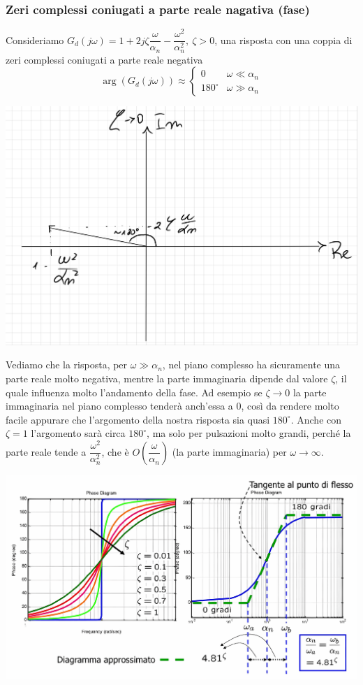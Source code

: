\documentclass{article}
\numberwithin{equation}{subsection}
\begin{document}
\subsubsection{Zeri complessi coniugati a parte reale nagativa (fase)}
Consideriamo $G_d(j\omega) = 1+ 2j \zeta \dfrac{\omega}{\alpha_n} - \dfrac{\omega^2}{\alpha_n^2}, \ \zeta>0$, una risposta con una coppia di zeri complessi coniugati a parte reale negativa
\[
    \arg(G_d(j \omega)) \approx 
    \begin{cases}
        0 & \omega \ll \alpha_n\\
        180^\circ &\omega \gg \alpha_n
    \end{cases}    
\]
\begin{center}
    \includegraphics[scale=0.175]{Images/Diagramma_zeri_cc_neg_1.png}
\end{center}
Vediamo che la risposta, per $\omega \gg \alpha_n$, nel piano complesso ha sicuramente una parte reale molto negativa, mentre la parte immaginaria dipende dal valore $\zeta$, il quale influenza molto l'andamento della fase. Ad esempio se $\zeta \rightarrow 0$ la parte immaginaria nel piano complesso tenderà anch'essa a 0, così da rendere molto facile appurare che l'argomento della nostra risposta sia quasi $180^\circ$. Anche con $\zeta =1$ l'argomento sarà circa $180^\circ$, ma solo per pulsazioni molto grandi, perché la parte reale tende a $\dfrac{\omega^2}{\alpha_n^2}$, che è $O(\dfrac{\omega}{\alpha_n})$ (la parte immaginaria) per $\omega \rightarrow \infty$.
\begin{center}
    \includegraphics[scale=0.15]{Images/Diagramma_zeri_cc_neg_2.png}
\end{center}
\end{document}
